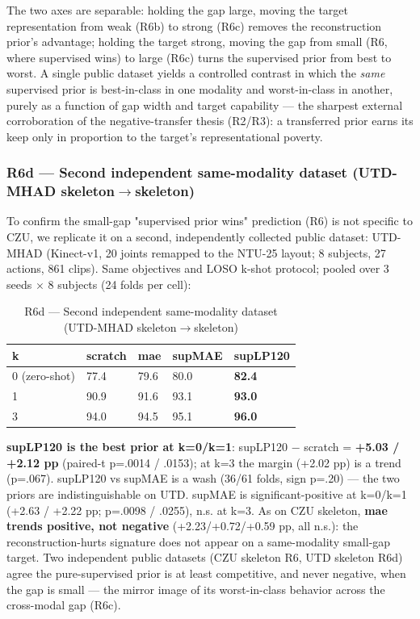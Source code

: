 The two axes are separable: holding the gap large, moving the target representation from weak (R6b) to strong (R6c) removes the reconstruction prior's advantage; holding the target strong, moving the gap from small (R6, where supervised wins) to large (R6c) turns the supervised prior from best to worst. A single public dataset yields a controlled contrast in which the \textit{same} supervised prior is best-in-class in one modality and worst-in-class in another, purely as a function of gap width and target capability --- the sharpest external corroboration of the negative-transfer thesis (R2/R3): a transferred prior earns its keep only in proportion to the target's representational poverty.

\subsubsection{R6d --- Second independent same-modality dataset (UTD-MHAD skeleton$\rightarrow$skeleton)}

To confirm the small-gap "supervised prior wins" prediction (R6) is not specific to CZU, we replicate it on a second, independently collected public dataset: UTD-MHAD (Kinect-v1, 20 joints remapped to the NTU-25 layout; 8 subjects, 27 actions, 861 clips). Same objectives and LOSO k-shot protocol; pooled over 3 seeds $\times$ 8 subjects (24 folds per cell):

\begin{table}[!t]
\centering
\caption{R6d --- Second independent same-modality dataset (UTD-MHAD skeleton$\rightarrow$skeleton)}
\small
\begin{tabular}{lllll}
\toprule
k & scratch & mae & supMAE & supLP120 \\
\midrule
0 (zero-shot) & 77.4 & 79.6 & 80.0 & \textbf{82.4} \\
1 & 90.9 & 91.6 & 93.1 & \textbf{93.0} \\
3 & 94.0 & 94.5 & 95.1 & \textbf{96.0} \\
\bottomrule
\end{tabular}
\end{table}

\textbf{supLP120 is the best prior at k=0/k=1}: supLP120 $-$ scratch = \textbf{+5.03 / +2.12 pp} (paired-t p=.0014 / .0153); at k=3 the margin (+2.02 pp) is a trend (p=.067). supLP120 vs supMAE is a wash (36/61 folds, sign p=.20) --- the two priors are indistinguishable on UTD. supMAE is significant-positive at k=0/k=1 (+2.63 / +2.22 pp; p=.0098 / .0255), n.s. at k=3. As on CZU skeleton, \textbf{mae trends positive, not negative} (+2.23/+0.72/+0.59 pp, all n.s.): the reconstruction-hurts signature does not appear on a same-modality small-gap target. Two independent public datasets (CZU skeleton R6, UTD skeleton R6d) agree the pure-supervised prior is at least competitive, and never negative, when the gap is small --- the mirror image of its worst-in-class behavior across the cross-modal gap (R6c).

